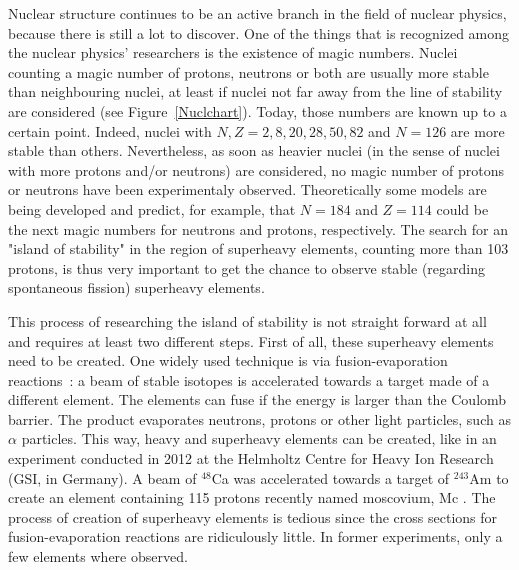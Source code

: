 \documentclass[11pt,a4paper]{article}
\begin{document}
Nuclear structure continues to be an active branch in the field of nuclear physics, because there is still a lot to discover. One of the things that is recognized among the nuclear physics' researchers is the existence of magic numbers. Nuclei counting a magic number of protons, neutrons or both are usually more stable than neighbouring nuclei, at least if nuclei not far away from the line of stability are considered (see Figure~\ref{Nuclchart}). Today, those numbers are known up to a certain point. Indeed, nuclei with $N, Z = 2, 8, 20, 28, 50, 82$ and $N = 126$ are more stable than others. Nevertheless, as soon as heavier nuclei (in the sense of nuclei with more protons and/or neutrons) are considered, no magic number of protons or neutrons have been experimentaly observed. Theoretically some models are being developed and predict, for example, that $N = 184$ and $Z = 114$ could be the next magic numbers for neutrons and protons, respectively. The search for an "island of stability" in the region of superheavy elements, counting more than 103 protons, is thus very important to get the chance to observe stable (regarding spontaneous fission) superheavy elements.

This process of researching the island of stability is not straight forward at all and requires at least two different steps. First of all, these superheavy elements need to be created. One widely used technique is via fusion-evaporation reactions~: a beam of stable isotopes is accelerated towards a target made of a different element. The elements can fuse if the energy is larger than the Coulomb barrier. The product evaporates neutrons, protons or other light particles, such as $\alpha$ particles. This way, heavy and superheavy elements can be created, like in an experiment conducted in 2012 at the Helmholtz Centre for Heavy Ion Research (GSI, in Germany). A beam of $^{48}$Ca was accelerated towards a target of $^{243}$Am to create an element containing 115 protons recently named moscovium, Mc \cite{element115}.
The process of creation of superheavy elements is tedious since the cross sections for fusion-evaporation reactions are ridiculously little. In former experiments, only a few elements where observed.
\end{document}
